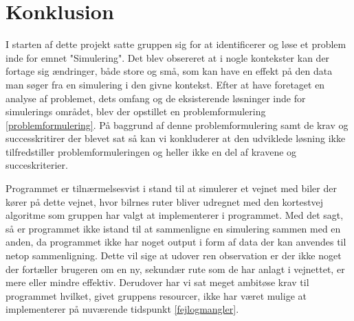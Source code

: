 \chapter{Konklusion}\label{Konklusion}
I starten af dette projekt satte gruppen sig for at identificerer og løse et problem inde for emnet "Simulering". Det blev obsereret at i nogle kontekster kan der fortage sig ændringer, både store og små, som kan have en effekt på den data man søger fra en simulering i den givne kontekst. Efter at have foretaget en analyse af problemet, dets omfang og de eksisterende løsninger inde for simulerings området, blev der opstillet en problemformulering \ref{problemformulering}. På baggrund af denne problemformulering samt de krav og successkritirer der blevet sat så kan vi konkluderer at den udviklede løsning ikke tilfredstiller problemformuleringen og heller ikke en del af kravene og succeskriterier.

Programmet er tilnærmelsesvist i stand til at simulerer et vejnet med biler der kører på dette vejnet, hvor bilrnes ruter bliver udregnet med den kortestvej algoritme som gruppen har valgt at implementerer i programmet. Med det sagt, så er programmet ikke istand til at sammenligne en simulering sammen med en anden, da programmet ikke har noget output i form af data der kan anvendes til netop sammenligning. Dette vil sige at udover ren observation er der ikke noget der fortæller brugeren om en ny, sekundær rute som de har anlagt i vejnettet, er mere eller mindre effektiv. Derudover har vi sat meget ambitøse krav til programmet hvilket, givet gruppens resourcer, ikke har været mulige at implementerer på nuværende tidspunkt \ref{fejlogmangler}. 